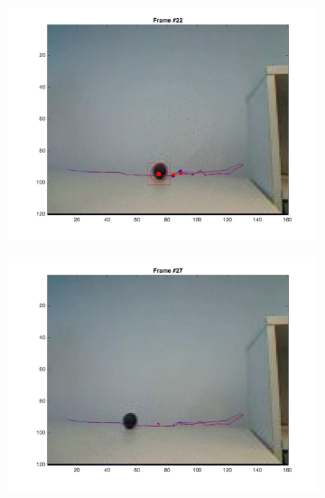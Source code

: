 \documentclass{ethz_report}
\begin{document}
\begin{figure}[h]
\begin{subfigure}[b]{.25\textwidth}
        \includegraphics[width=1\linewidth]{images/video3_observe_low_21}
    \end{subfigure}%
    \begin{subfigure}[b]{.25\textwidth}
        \centering
        \includegraphics[width=1\linewidth]{images/video3_observe_low_26}
    \end{subfigure}%
    \begin{subfigure}[b]{.25\textwidth}
        \centering

\end{subfigure}
\end{figure}
\end{document}
